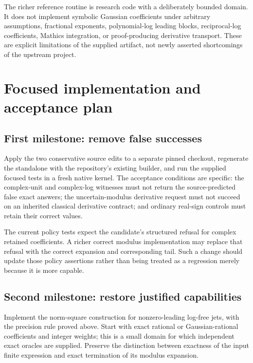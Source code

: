\documentclass[11pt,a4paper]{article}
\begin{document}
The richer reference routine is research code with a deliberately bounded domain. It does not implement symbolic Gaussian coefficients under arbitrary assumptions, fractional exponents, polynomial-log leading blocks, reciprocal-log coefficients, Mathics integration, or proof-producing derivative transport. These are explicit limitations of the supplied artifact, not newly asserted shortcomings of the upstream project.

\section{Focused implementation and acceptance plan}

\subsection{First milestone: remove false successes}

Apply the two conservative source edits to a separate pinned checkout, regenerate the standalone with the repository's existing builder, and run the supplied focused tests in a fresh native kernel. The acceptance conditions are specific: the complex-unit and complex-log witnesses must not return the source-predicted false exact answers; the uncertain-modulus derivative request must not succeed on an inherited classical derivative contract; and ordinary real-sign controls must retain their correct values.

The current policy tests expect the candidate's structured refusal for complex retained coefficients. A richer correct modulus implementation may replace that refusal with the correct expansion and corresponding tail. Such a change should update those policy assertions rather than being treated as a regression merely because it is more capable.

\subsection{Second milestone: restore justified capabilities}

Implement the norm-square construction for nonzero-leading log-free jets, with the precision rule proved above. Start with exact rational or Gaussian-rational coefficients and integer weights; this is a small domain for which independent exact oracles are supplied. Preserve the distinction between exactness of the input finite expression and exact termination of its modulus expansion.
\end{document}
